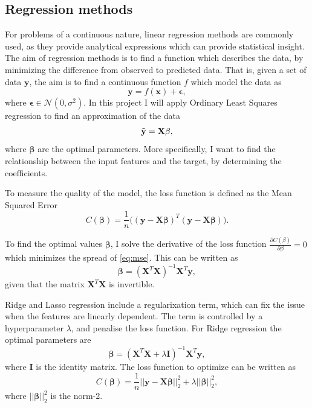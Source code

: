 \subsection{Regression methods}\label{ssec:regression_methods}
For problems of a continuous nature, linear regression methods are commonly used, as they provide analytical expressions which can provide statistical insight. The aim of regression methods is to find a function which describes the data, by minimizing the difference from observed to predicted data. That is, given a set of data $\mathbf{y}$, the aim is to find a continuous function $f$ which model the data as
\begin{equation*}
    \mathbf{y} = f( \mathbf{x} ) + \mathbf{\epsilon}, 
\end{equation*}
where $\mathbf{\epsilon} \in \mathcal{N}(0, \sigma^{2})$. In this project I will apply Ordinary Least Squares regression to find an approximation of the data 
\begin{equation*}
    \mathbf{\Tilde{y}} = \mathbf{X} \mathbf{\beta},
\end{equation*}
where $\mathbf{\beta}$ are the optimal parameters. More specifically, I want to find the relationship between the input features and the target, by determining the coefficients. 

To measure the quality of the model, the loss function is defined as the Mean Squared Error
\begin{equation}\label{eq:mse}
    C (\mathbf{\beta}) = \frac{1}{n} \big( (\mathbf{y} - \mathbf{X} \mathbf{\beta})^{T} (\mathbf{y} - \mathbf{X} \mathbf{\beta}) \big).
\end{equation}

To find the optimal values $\mathbf{\beta}$, I solve the derivative of the loss function $\frac{\partial C (\beta)}{\partial \beta} = 0$ which minimizes the spread of \eqref{eq:mse}. This can be written as  
\begin{equation}
    \mathbf{\beta} = (\mathbf{X}^{T}\mathbf{X})^{-1} \mathbf{X}^{T} \mathbf{y},
\end{equation}
given that the matrix $\mathbf{X}^{T}\mathbf{X}$ is invertible.


Ridge and Lasso regression include a regularixation term, which can fix the issue when the features are linearly dependent. The term is controlled by a hyperparameter $\lambda$, and penalise the loss function. For Ridge regression the optimal parameters are
\begin{equation}\label{eq:ridge_beta}
    \mathbf{\beta} = (\mathbf{X}^{T}\mathbf{X} + \lambda \mathbf{I})^{-1} \mathbf{X}^{T} \mathbf{y},
\end{equation}
where $\mathbf{I}$ is the identity matrix. The loss function to optimize can be written as
\begin{equation}\label{eq:ridge_cost}
    C (\mathbf{\beta}) = \frac{1}{n} || \mathbf{y} - \mathbf{X} \mathbf{\beta} ||_{2}^{2} + \lambda || \mathbf{\beta} ||_{2}^{2} ,
\end{equation}
where $|| \mathbf{\beta} ||_{2}^{2}$ is the norm-2.

